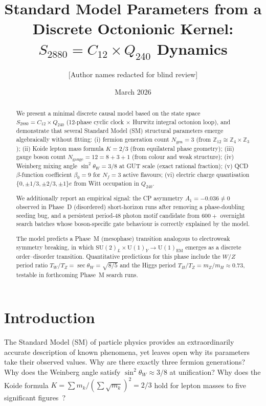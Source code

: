 \documentclass[11pt,a4paper]{article}
\title{Standard Model Parameters from a Discrete Octonionic Kernel:\\
       $S_{2880} = C_{12} \times Q_{240}$ Dynamics}
\author{[Author names redacted for blind review]}
\date{March 2026}
\theoremstyle{remark}
\begin{document}
\maketitle

\begin{abstract}
We present a minimal discrete causal model based on the state space
$S_{2880} = C_{12} \times Q_{240}$ (12-phase cyclic clock $\times$ Hurwitz integral
octonion loop), and demonstrate that several Standard Model (SM) structural parameters
emerge algebraically without fitting:
(i) fermion generation count $N_{\mathrm{gen}} = 3$ (from $\mathbb{Z}_{12} \cong \mathbb{Z}_4 \times \mathbb{Z}_3$);
(ii) Koide lepton mass formula $K = 2/3$ (from equilateral phase geometry);
(iii) gauge boson count $N_{\mathrm{gauge}} = 12 = 8 + 3 + 1$ (from colour and weak structure);
(iv) Weinberg mixing angle $\sin^2\theta_W = 3/8$ at GUT scale (exact rational fraction);
(v) QCD $\beta$-function coefficient $\beta_0 = 9$ for $N_f = 3$ active flavours;
(vi) electric charge quantisation $\{0, \pm 1/3, \pm 2/3, \pm 1\}e$ from Witt occupation in $Q_{240}$.

We additionally report an empirical signal: the CP asymmetry $A_1 = -0.036 \neq 0$
observed in Phase~D (disordered) short-horizon runs after removing a phase-doubling seeding
bug, and a persistent period-48 photon motif candidate from $600+$ overnight search batches
whose boson-specific gate behaviour is correctly explained by the model.

The model predicts a Phase~M (mesophase) transition analogous to electroweak symmetry
breaking, in which $\mathrm{SU}(2)_L \times \mathrm{U}(1)_Y \to \mathrm{U}(1)_{\mathrm{EM}}$
emerges as a discrete order--disorder transition.
Quantitative predictions for this phase include the $W/Z$ period ratio
$T_W/T_Z = \sec\theta_W = \sqrt{8/5}$ and the Higgs period $T_H/T_Z = m_Z/m_H \approx 0.73$,
testable in forthcoming Phase~M search runs.
\end{abstract}

\section{Introduction}
\label{sec:intro}

The Standard Model (SM) of particle physics provides an extraordinarily accurate
description of known phenomena, yet leaves open why its parameters take their observed
values.  Why are there exactly three fermion generations?  Why does the Weinberg angle
satisfy $\sin^2\theta_W \approx 3/8$ at unification?  Why does the Koide formula
$K = \sum m_k / (\sum \sqrt{m_k})^2 = 2/3$ hold for lepton masses to five significant
figures~\cite{Koide1983,Brannen2006}?
\end{document}
